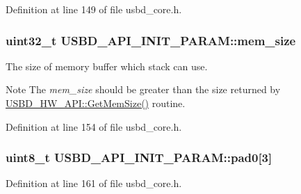 Definition at line 149 of file usbd\+\_\+core.\+h.

\subsubsection[{\texorpdfstring{mem\+\_\+size}{mem_size}}]{\setlength{\rightskip}{0pt plus 5cm}uint32\+\_\+t U\+S\+B\+D\+\_\+\+A\+P\+I\+\_\+\+I\+N\+I\+T\+\_\+\+P\+A\+R\+A\+M\+::mem\+\_\+size}\hypertarget{structUSBD__API__INIT__PARAM_a237d34b2303d35b80c7ebb9c58326bf9}{}\label{structUSBD__API__INIT__PARAM_a237d34b2303d35b80c7ebb9c58326bf9}
The size of memory buffer which stack can use. \begin{DoxyNote}{Note}
The {\itshape mem\+\_\+size} should be greater than the size returned by \hyperlink{structUSBD__HW__API_a59a65bd037723d735b684c308d99fc54}{U\+S\+B\+D\+\_\+\+H\+W\+\_\+\+A\+P\+I\+::\+Get\+Mem\+Size()} routine. 
\end{DoxyNote}


Definition at line 154 of file usbd\+\_\+core.\+h.

\subsubsection[{\texorpdfstring{pad0}{pad0}}]{\setlength{\rightskip}{0pt plus 5cm}uint8\+\_\+t U\+S\+B\+D\+\_\+\+A\+P\+I\+\_\+\+I\+N\+I\+T\+\_\+\+P\+A\+R\+A\+M\+::pad0\mbox{[}3\mbox{]}}\hypertarget{structUSBD__API__INIT__PARAM_ab537ed0a84e63aaf79592e8bd500c79c}{}\label{structUSBD__API__INIT__PARAM_ab537ed0a84e63aaf79592e8bd500c79c}


Definition at line 161 of file usbd\+\_\+core.\+h.

